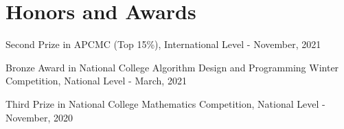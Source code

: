 \documentclass[a4paper,20pt]{article}
\makeatletter
\newcommand{\resumeSubheading}[4]{
  \vspace{-1pt}\item
    \begin{tabular*}{0.97\textwidth}{l@{\extracolsep{\fill}}r}
      \textbf{#1} & \textbf{#2} \\
      \textit{#3} & \textit{#4} \\
    \end{tabular*}\vspace{-5pt}
}
\newcommand{\resumeSubHeadingListStart}{\begin{itemize}[leftmargin=*]}
\newcommand{\resumeSubHeadingListEnd}{\end{itemize}}
\makeatother
\begin{document}
\section{Honors and Awards}
\begin{description}[font=$\bullet$]
\item {Second Prize in APCMC (Top 15\%), International Level - November, 2021}
\vspace{-5pt}
\item {\small Bronze Award in National College Algorithm Design and Programming Winter Competition, National Level - March, 2021}
\vspace{-5pt}
\item {Third Prize in National College Mathematics Competition, National Level - November, 2020}
\end{description}


\end{document}
